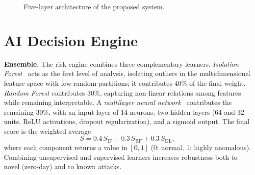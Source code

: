 \documentclass[conference]{IEEEtran}
\begin{document}
\begin{figure}[t]
\centering
{}
\caption{Five-layer architecture of the proposed system.}
\label{fig:arch}
\end{figure}

\section{AI Decision Engine}
\label{sec:ai}
\textbf{Ensemble.} The risk engine combines three complementary
learners. \emph{Isolation Forest}~\cite{liu2008} acts as the first
level of analysis, isolating outliers in the multidimensional feature
space with few random partitions; it contributes 40\% of the final
weight. \emph{Random Forest} contributes 30\%, capturing non-linear
relations among features while remaining interpretable. A
\emph{multilayer neural network}~\cite{goodfellow2016} contributes the
remaining 30\%, with an input layer of 14 neurons, two hidden layers
(64 and 32 units, ReLU activations, dropout regularization), and a
sigmoid output. The final score is the weighted average
\begin{equation}
S = 0.4\,S_{\mathrm{IF}} + 0.3\,S_{\mathrm{RF}} + 0.3\,S_{\mathrm{DL}},
\label{eq:ensemble}
\end{equation}
where each component returns a value in $[0,1]$ (0: normal, 1: highly
anomalous). Combining unsupervised and supervised learners increases
robustness both to novel (zero-day) and to known attacks.
\end{document}
